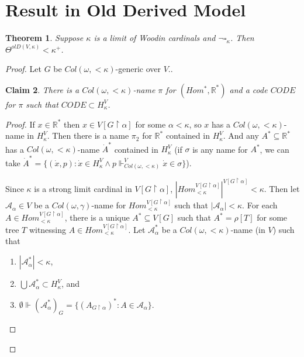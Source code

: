 \documentclass[12pt]{article}
\newtheorem{theorem}{Theorem}[section]
\newtheorem{claim}[theorem]{Claim}
\newcommand\R{\mathbb{R}}
\begin{document}
\section{Result in Old Derived Model}

\begin{theorem}
\label{result in old derived model}
    Suppose $\kappa$ is a limit of Woodin cardinals and $\neg \square_\kappa$. Then $\Theta^{olD(V,\kappa)} < \kappa^+$.
\end{theorem}
\begin{proof}
    Let $G$ be $Col(\omega,<\kappa)$-generic over $V$..

    \begin{claim}
    \label{size of hom}
        There is a $Col(\omega,<\kappa)$-name $\pi$ for $(Hom^*,\R^*)$ and a code $CODE$ for $\pi$ such that $CODE \subset H^V_\kappa$.
    \end{claim}
    \begin{proof}
        If $x\in \R^*$ then $x\in V[G\upharpoonright \alpha]$ for some $\alpha < \kappa$, so $x$ has a $Col(\omega,<\kappa)$-name in $H^V_\kappa$. Then there is a name $\pi_2$ for $\R^*$ contained in $H^V_\kappa$. And any $A^* \subseteq \R^*$ has a $Col(\omega,<\kappa)$-name $\dot{A}^*$ contained in $H^V_\kappa$ (if $\sigma$ is any name for $A^*$, we can take $\dot{A}^* = \{(\dot{x},p): \dot{x}\in H^V_\kappa \wedge p \Vdash^V_{Col(\omega,<\kappa)} \dot{x}\in\sigma\}$).

        Since $\kappa$ is a strong limit cardinal in $V[G\upharpoonright\alpha]$, $|Hom_{<\kappa}^{V[G\upharpoonright\alpha]}|^{V[G\upharpoonright\alpha]} < \kappa$. Then let $\mathcal{A_\alpha}\in V$ be a $Col(\omega,\gamma)$-name for $Hom_{<\kappa}^{V[G\upharpoonright\alpha]}$ such that $|\mathcal{A}_\alpha| <  \kappa$. For each $A\in Hom_{<\kappa}^{V[G\upharpoonright\alpha]}$, there is a unique $A^*\subseteq V[G]$ such that $A^* = \rho[T]$ for some tree $T$ witnessing $A\in Hom_{<\kappa}^{V[G\upharpoonright\alpha]}$. Let $\mathcal{A}_\alpha^*$ be a $Col(\omega,<\kappa)$-name (in $V$) such that
        \begin{enumerate}
            \item $|\mathcal{A}_\alpha^*| < \kappa$,
            \item $\bigcup \mathcal{A}_\alpha^*\subset H^V_\kappa$, and
            \item $\emptyset \Vdash (\mathcal{A}_\alpha^*)_G = \{(A_{G\upharpoonright\alpha})^* : A \in \mathcal{A}_\alpha\}$.
        \end{enumerate}


\end{proof}
\end{proof}
\end{document}
